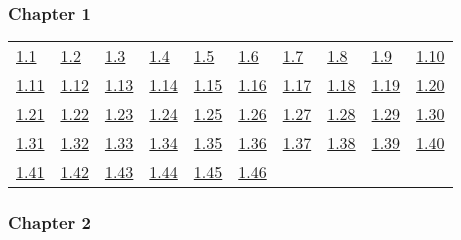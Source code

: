\subsubsection*{Chapter 1} 

\begin{tabular}{llllllllll}
\hyperref[Exercise 1.1]{1.1} &
\hyperref[Exercise 1.2]{1.2} &
\hyperref[Exercise 1.3]{1.3} &
\hyperref[Exercise 1.4]{1.4} &
\hyperref[Exercise 1.5]{1.5} &
\hyperref[Exercise 1.6]{1.6} &
\hyperref[Exercise 1.7]{1.7} &
\hyperref[Exercise 1.8]{1.8} &
\hyperref[Exercise 1.9]{1.9} &
\hyperref[Exercise 1.10]{1.10}
\\ 
\hyperref[Exercise 1.11]{1.11} &
\hyperref[Exercise 1.12]{1.12} &
\hyperref[Exercise 1.13]{1.13} &
\hyperref[Exercise 1.14]{1.14} &
\hyperref[Exercise 1.15]{1.15} &
\hyperref[Exercise 1.16]{1.16} &
\hyperref[Exercise 1.17]{1.17} &
\hyperref[Exercise 1.18]{1.18} &
\hyperref[Exercise 1.19]{1.19} &
\hyperref[Exercise 1.20]{1.20}
\\ 
\hyperref[Exercise 1.21]{1.21} &
\hyperref[Exercise 1.22]{1.22} &
\hyperref[Exercise 1.23]{1.23} &
\hyperref[Exercise 1.24]{1.24} &
\hyperref[Exercise 1.25]{1.25} &
\hyperref[Exercise 1.26]{1.26} &
\hyperref[Exercise 1.27]{1.27} &
\hyperref[Exercise 1.28]{1.28} &
\hyperref[Exercise 1.29]{1.29} &
\hyperref[Exercise 1.30]{1.30}
\\ 
\hyperref[Exercise 1.31]{1.31} &
\hyperref[Exercise 1.32]{1.32} &
\hyperref[Exercise 1.33]{1.33} &
\hyperref[Exercise 1.34]{1.34} &
\hyperref[Exercise 1.35]{1.35} &
\hyperref[Exercise 1.36]{1.36} &
\hyperref[Exercise 1.37]{1.37} &
\hyperref[Exercise 1.38]{1.38} &
\hyperref[Exercise 1.39]{1.39} &
\hyperref[Exercise 1.40]{1.40}
\\ 
\hyperref[Exercise 1.41]{1.41} &
\hyperref[Exercise 1.42]{1.42} &
\hyperref[Exercise 1.43]{1.43} &
\hyperref[Exercise 1.44]{1.44} &
\hyperref[Exercise 1.45]{1.45} &
\hyperref[Exercise 1.46]{1.46} &
\end{tabular} 

\subsubsection*{Chapter 2} 

